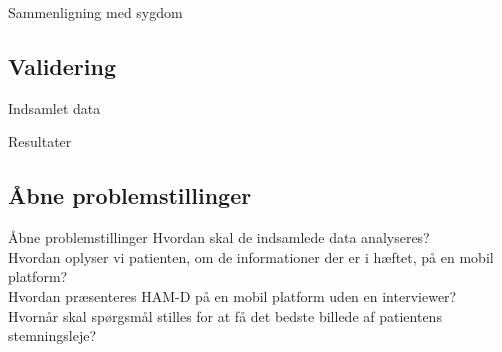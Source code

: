 \begin{frame}{Sammenligning med sygdom}
\end{frame}

\subsection{Validering}
\begin{frame}{Indsamlet data}
\end{frame}
\begin{frame}{Resultater}
\end{frame}

\subsection{Åbne problemstillinger}
\begin{frame}{Åbne problemstillinger}
Hvordan skal de indsamlede data analyseres?\\
Hvordan oplyser vi patienten, om de informationer der er i hæftet, på en mobil platform?\\
Hvordan præsenteres HAM-D på en mobil platform uden en interviewer?\\
Hvornår skal spørgsmål stilles for at få det bedste billede af patientens stemningsleje?\\

\end{frame}
